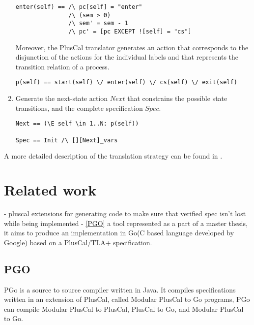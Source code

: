 \documentclass{thesul}
\begin{document}
\begin{enumerate}
\begin{lstlisting}[frame = tlrb, firstnumber = 1, xleftmargin=.2\textwidth, xrightmargin=.2\textwidth]
enter(self) == /\ pc[self] = "enter"
               /\ (sem > 0)
               /\ sem' = sem - 1
               /\ pc' = [pc EXCEPT ![self] = "cs"]
\end{lstlisting}

Moreover, the PlusCal translator generates an action that corresponds to the disjunction of the actions for the individual labels and that represents the transition relation of a process.

\begin{lstlisting}[frame = tlrb, firstnumber = 1, xleftmargin=.05\textwidth, xrightmargin=.05\textwidth]
p(self) == start(self) \/ enter(self) \/ cs(self) \/ exit(self)
\end{lstlisting}

\item Generate the next-state action $Next$ that constrains the possible state transitions, and the complete specification $Spec$.

\begin{lstlisting}[frame = tlrb, firstnumber = 1, xleftmargin=.2\textwidth, xrightmargin=.2\textwidth]
Next == (\E self \in 1..N: p(self))

Spec == Init /\ [][Next]_vars

\end{lstlisting}

\end{enumerate}

A more detailed description of the translation strategy can be found in \cite{pcalAlgo}.

\chapter{Related work}

- pluscal extensions for generating code to make sure that verified spec isn't lost while being implemented
- \ref{PGO} a tool represented as a part of a master thesis, it aims to produce an implementation in Go(C based language developed by Google) based on a PlusCal/TLA+ specification.

\section{PGO}

PGo is a source to source compiler written in Java. It compiles specifications written in an extension of PlusCal, called Modular PlusCal to Go programs, PGo can compile Modular PlusCal to PlusCal, PlusCal to Go, and Modular PlusCal to Go.
\end{document}

